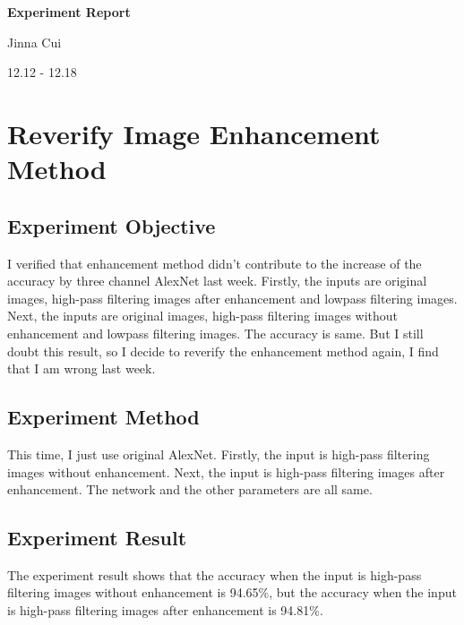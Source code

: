 \documentclass{article}
\begin{document}


\pagestyle{fancy}
\begin{center}
\textbf{\LARGE{Experiment Report}} %
\end{center}

\begin{center}
Jinna Cui
\end{center}

\begin{center}
12.12 - 12.18
\end{center}

\section{Reverify Image Enhancement Method}
\subsection{Experiment Objective}
I verified that enhancement method didn't contribute to the increase of the accuracy by three channel AlexNet last week. Firstly, the inputs are original images, high-pass filtering images after enhancement and lowpass filtering images. Next, the inputs are original images, high-pass filtering images without enhancement and lowpass filtering images. The accuracy is same. But I still doubt this result, so I decide to reverify the enhancement method again, I find that I am wrong last week.

\subsection{Experiment Method}
This time, I just use original AlexNet. Firstly, the input is high-pass filtering images without enhancement. Next, the input is high-pass filtering images after enhancement. The network and the other parameters are all same.
\subsection{Experiment Result}
The experiment result shows that the accuracy when the input is high-pass filtering images without enhancement is 94.65\%, but the accuracy when the input is high-pass filtering images after enhancement is 94.81\%. 
\end{document}
